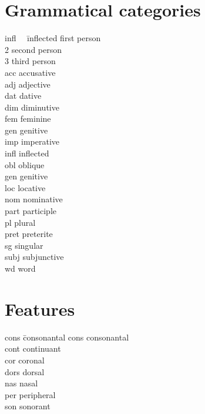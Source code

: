 \section*{Grammatical categories}
\begin{multicols}{3}
\begin{tabbing}
infl~~ \= inflected     \>  first person\\
2     \>  second person\\
3     \>  third person\\
acc   \>   accusative\\
adj   \>   adjective\\
dat   \>   dative\\
dim   \>   diminutive\\
fem   \>   feminine\\
gen   \>   genitive\\
imp   \>   imperative\\
infl  \>   inflected\\
obl   \>  oblique\\
gen   \>  genitive\\
loc   \>  locative\\
nom   \>  nominative\\
part  \>   participle\\
pl    \>  plural\\
pret  \>  preterite\\
sg    \>  singular\\
subj  \>  subjunctive\\
wd    \>  word
\end{tabbing}
\end{multicols}

\section*{Features}
\begin{multicols}{3}
\begin{tabbing}
cons \= consonantal\kill
cons  \>  consonantal\\
cont  \>  continuant\\
cor   \>  coronal\\
dors  \>  dorsal\\
nas   \>  nasal\\
per   \>  peripheral\\
son   \>  sonorant
\end{tabbing}
\end{multicols}

